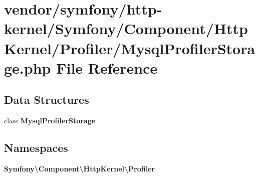 \section{vendor/symfony/http-\/kernel/\+Symfony/\+Component/\+Http\+Kernel/\+Profiler/\+Mysql\+Profiler\+Storage.php File Reference}
\label{_mysql_profiler_storage_8php}
\subsection*{Data Structures}
\begin{DoxyCompactItemize}
\item 
class {\bf Mysql\+Profiler\+Storage}
\end{DoxyCompactItemize}
\subsection*{Namespaces}
\begin{DoxyCompactItemize}
\item 
 {\bf Symfony\textbackslash{}\+Component\textbackslash{}\+Http\+Kernel\textbackslash{}\+Profiler}
\end{DoxyCompactItemize}
